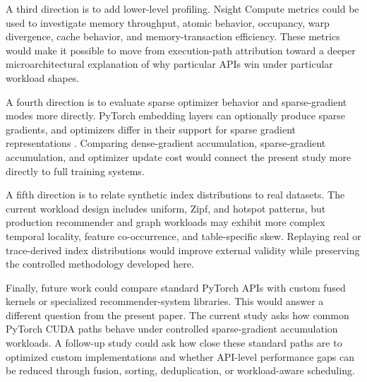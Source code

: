 A third direction is to add lower-level profiling. Nsight Compute metrics could be used to investigate memory throughput, atomic behavior, occupancy, warp divergence, cache behavior, and memory-transaction efficiency. These metrics would make it possible to move from execution-path attribution toward a deeper microarchitectural explanation of why particular APIs win under particular workload shapes.

A fourth direction is to evaluate sparse optimizer behavior and sparse-gradient modes more directly. PyTorch embedding layers can optionally produce sparse gradients, and optimizers differ in their support for sparse gradient representations \cite{pytorchStableEmbedding}. Comparing dense-gradient accumulation, sparse-gradient accumulation, and optimizer update cost would connect the present study more directly to full training systems.

A fifth direction is to relate synthetic index distributions to real datasets. The current workload design includes uniform, Zipf, and hotspot patterns, but production recommender and graph workloads may exhibit more complex temporal locality, feature co-occurrence, and table-specific skew. Replaying real or trace-derived index distributions would improve external validity while preserving the controlled methodology developed here.

Finally, future work could compare standard PyTorch APIs with custom fused kernels or specialized recommender-system libraries. This would answer a different question from the present paper. The current study asks how common PyTorch CUDA paths behave under controlled sparse-gradient accumulation workloads. A follow-up study could ask how close these standard paths are to optimized custom implementations and whether API-level performance gaps can be reduced through fusion, sorting, deduplication, or workload-aware scheduling.
